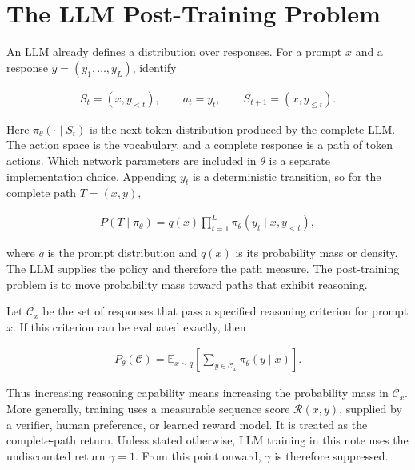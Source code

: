 \documentclass[11pt]{article}
\newcommand{\E}{\mathbb{E}}
\begin{document}
\newpage
\section{The LLM Post-Training Problem}

An LLM already defines a distribution over responses.  For a prompt \(x\)
and a response \(y=(y_1,\ldots,y_L)\), identify

\begin{equation}
    \begin{split}
        S_t=(x,y_{<t}),
        \qquad
        a_t=y_t,
        \qquad
        S_{t+1}=(x,y_{\leq t}).
    \end{split}
    \label{eq:llm-state-action}
\end{equation}

Here \(\pi_\theta(\cdot\mid S_t)\) is the next-token distribution produced
by the complete LLM.  The action space is the vocabulary, and a complete
response is a path of token actions.  Which network parameters are included
in \(\theta\) is a separate implementation choice.  Appending \(y_t\) is a
deterministic transition, so for the complete path \(T=(x,y)\),

\begin{equation}
    \begin{split}
        P(T\mid\pi_\theta)
          =q(x)\prod_{t=1}^{L}
           \pi_\theta(y_t\mid x,y_{<t}),
    \end{split}
    \label{eq:autoregressive-path}
\end{equation}

where \(q\) is the prompt distribution and \(q(x)\) is its probability mass
or density.  The LLM supplies the policy and
therefore the path measure.  The post-training problem is to move probability
mass toward paths that exhibit reasoning.

Let \(\mathcal C_x\) be the set of responses that pass a specified reasoning
criterion for prompt \(x\).  If this criterion can be evaluated exactly, then

\begin{equation}
    \begin{split}
        P_\theta(\mathcal C)
          =\E_{x\sim q}\left[
           \sum_{y\in\mathcal C_x}\pi_\theta(y\mid x)
           \right].
    \end{split}
    \label{eq:reasoning-probability}
\end{equation}

Thus increasing reasoning capability means increasing the probability mass
in \(\mathcal C_x\).  More generally, training uses a measurable sequence
score \(\mathcal R(x,y)\), supplied by a verifier, human preference, or
learned reward model.  It is treated as the complete-path return.  Unless
stated otherwise, LLM training in this note uses the undiscounted return
\(\gamma=1\).  From this point onward, \(\gamma\) is therefore suppressed.
\end{document}
